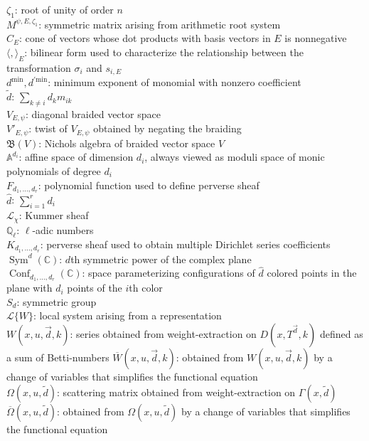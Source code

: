 \documentclass[11pt,letterpaper]{article}
\theoremstyle{definition}
\theoremstyle{remark}
\numberwithin{equation}{section}
\theoremstyle{dotless}
\newcommand{\hchi}{\psi} %
\newcommand{\gene}{\zeta_1} %
\renewcommand{\tilde}{\widetilde}
\begin{document}
$\gene$: root of unity of order $n$ \\
$M^{\hchi,E,\gene}$: symmetric matrix arising from arithmetic root system \\
$C_E$: cone of vectors whose dot products with basis vectors in $E$ is nonnegative \\
$\langle, \rangle_E$: bilinear form used to characterize the relationship between the transformation $\sigma_i$ and $s_{i,E}$ \\
$d^{\mathrm{min}}, d^{'\mathrm{min}}$: minimum exponent of monomial with nonzero coefficient \\
$\tilde{d}$: $\sum_{k\neq i} d_k m_{ik}$\\
$V_{E,\hchi}$: diagonal braided vector space \\
$V'_{E,\hchi}$: twist of $V_{E,\hchi}$ obtained by negating the braiding  \\
$\mathfrak B(V)$: Nichols algebra of braided vector space $V$ \\
$\mathbb A^{d_i}$: affine space of dimension $d_i$, always viewed as moduli space of monic polynomials of degree $d_i$ \\
$F_{d_1,\dots,d_r}$: polynomial function used to define perverse sheaf \\
$\hat{d}$: $\sum_{i=1}^r d_i$ \\
$\mathcal L_\chi$: Kummer sheaf \\
$\mathbb Q_\ell$: $\ell$-adic numbers \\
$K_{d_1,\dots,d_r}$: perverse sheaf used to obtain multiple Dirichlet series coefficients \\
$\operatorname{Sym}^d (\mathbb C)$: $d$th symmetric power of the complex plane \\
$\operatorname{Conf}_{d_1,\dots,d_r} (\mathbb C)$: space parameterizing configurations of $\hat{d}$ colored points in the plane with $d_i$ points of the $i$th color \\
$S_d$: symmetric group \\
$\mathcal L\{W\}$: local system arising from a representation \\
$W(x,u, \vec{d},k)$: series obtained from weight-extraction on $D(x, T^{\vec{d}},k)$ defined as a sum of Betti-numbers
$\overline{W}(x,u, \vec{d},k)$: obtained from $W(x,u, \vec{d},k)$ by a change of variables that simplifies the functional equation\\
$\Omega(x, u, \tilde{d})$: scattering matrix obtained from weight-extraction on $\Gamma(x, \tilde{d})$ \\
$\overline{\Omega}(x, u, \tilde{d})$: obtained from $\Omega(x, u, \tilde{d})$ by a change of variables that simplifies the functional equation 
\end{document}
